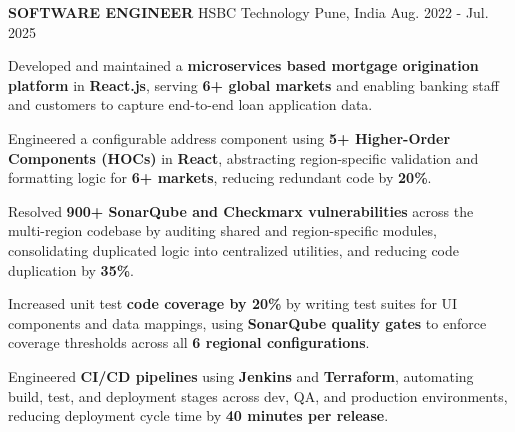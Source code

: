 \begin{cventries}
  \cventry
    {\textbf{SOFTWARE ENGINEER}} %
    {HSBC Technology} %
    {Pune, India} %
    {Aug. 2022 - Jul. 2025} %
    {
      \begin{cvitems} %
        \item {Developed and maintained a \textbf{microservices based mortgage origination platform} in \textbf{React.js}, serving \textbf{6+ global markets} and enabling banking staff and customers to capture end-to-end loan application data.}
        \item {Engineered a configurable address component using \textbf{5+ Higher-Order Components (HOCs)} in \textbf{React}, abstracting region-specific validation and formatting logic for \textbf{6+ markets}, reducing redundant code by \textbf{20\%}.} %
        \item {Resolved \textbf{900+ SonarQube and Checkmarx vulnerabilities} across the multi-region codebase by auditing shared and region-specific modules, consolidating duplicated logic into centralized utilities, and reducing code duplication by \textbf{35\%}.} %
        \item {Increased unit test \textbf{code coverage by 20\%} by writing test suites for UI components and data mappings, using \textbf{SonarQube quality gates} to enforce coverage thresholds across all \textbf{6 regional configurations}.}
        \item {Engineered \textbf{CI/CD pipelines} using \textbf{Jenkins} and \textbf{Terraform}, automating build, test, and deployment stages across dev, QA, and production environments, reducing deployment cycle time by \textbf{40 minutes per release}.}

\end{cvitems}}
\end{cventries}
